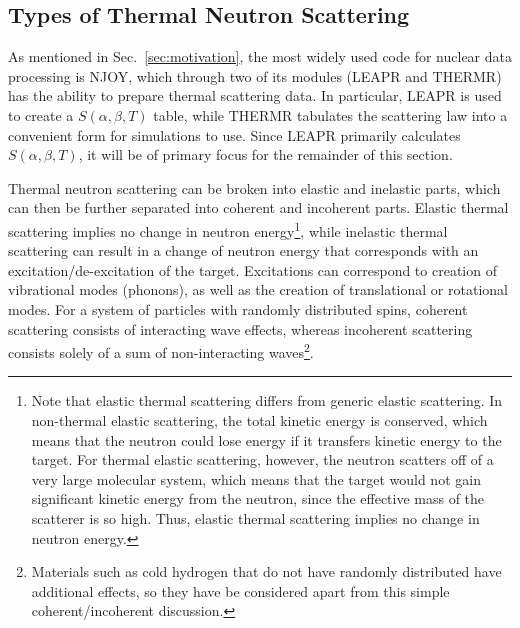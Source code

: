 \documentclass[../master.tex]{subfiles}
\begin{document}
		\subsection{Types of Thermal Neutron Scattering}
			As mentioned in Sec.~\ref{sec:motivation}, the most widely used code for nuclear data processing is NJOY, which through two of its modules (LEAPR and THERMR) has the ability to prepare thermal scattering data. In particular, LEAPR is used to create a $S(\alpha,\beta,T)$ table, while THERMR tabulates the scattering law into a convenient form for simulations to use. Since LEAPR primarily calculates $S(\alpha,\beta,T)$, it will be of primary focus for the remainder of this section.\par

                        Thermal neutron scattering can be broken into elastic and inelastic parts, which can then be further separated into coherent and incoherent parts. Elastic thermal scattering implies no change in neutron energy\footnote{Note that elastic thermal scattering differs from generic elastic scattering. In non-thermal elastic scattering, the total kinetic energy is conserved, which means that the neutron could lose energy if it transfers kinetic energy to the target. For thermal elastic scattering, however, the neutron scatters off of a very large molecular system, which means that the target would not gain significant kinetic energy from the neutron, since the effective mass of the scatterer is so high. Thus, elastic thermal scattering implies no change in neutron energy.}, while inelastic thermal scattering can result in a change of neutron energy that corresponds with an excitation/de-excitation of the target.  
                        Excitations can correspond to creation of vibrational modes (phonons), as well as the creation of translational or rotational modes. For a system of particles with randomly distributed spins, coherent scattering consists of interacting wave effects, whereas incoherent scattering consists solely of a sum of non-interacting waves\footnote{Materials such as cold hydrogen that do not have randomly distributed have additional effects, so they have be considered apart from this simple coherent/incoherent discussion.}.\par
\end{document}

